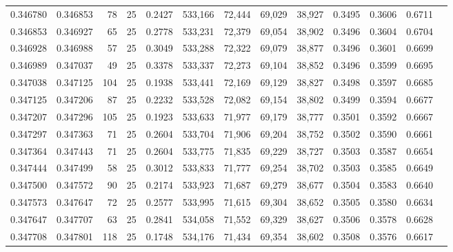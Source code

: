 \begin{tabular}{rrrrrrrrrrrrr}
0.346780 & 0.346853 &    78 &  25 &                                     0.2427 & 533,166 &  72,444 &  69,029 &  38,927 & 0.3495 & 0.3606 & 0.6711 \\
0.346853 & 0.346927 &    65 &  25 &                                     0.2778 & 533,231 &  72,379 &  69,054 &  38,902 & 0.3496 & 0.3604 & 0.6704 \\
0.346928 & 0.346988 &    57 &  25 &                                     0.3049 & 533,288 &  72,322 &  69,079 &  38,877 & 0.3496 & 0.3601 & 0.6699 \\
0.346989 & 0.347037 &    49 &  25 &                                     0.3378 & 533,337 &  72,273 &  69,104 &  38,852 & 0.3496 & 0.3599 & 0.6695 \\
0.347038 & 0.347125 &   104 &  25 &                                     0.1938 & 533,441 &  72,169 &  69,129 &  38,827 & 0.3498 & 0.3597 & 0.6685 \\
0.347125 & 0.347206 &    87 &  25 &                                     0.2232 & 533,528 &  72,082 &  69,154 &  38,802 & 0.3499 & 0.3594 & 0.6677 \\
0.347207 & 0.347296 &   105 &  25 &                                     0.1923 & 533,633 &  71,977 &  69,179 &  38,777 & 0.3501 & 0.3592 & 0.6667 \\
0.347297 & 0.347363 &    71 &  25 &                                     0.2604 & 533,704 &  71,906 &  69,204 &  38,752 & 0.3502 & 0.3590 & 0.6661 \\
0.347364 & 0.347443 &    71 &  25 &                                     0.2604 & 533,775 &  71,835 &  69,229 &  38,727 & 0.3503 & 0.3587 & 0.6654 \\
0.347444 & 0.347499 &    58 &  25 &                                     0.3012 & 533,833 &  71,777 &  69,254 &  38,702 & 0.3503 & 0.3585 & 0.6649 \\
0.347500 & 0.347572 &    90 &  25 &                                     0.2174 & 533,923 &  71,687 &  69,279 &  38,677 & 0.3504 & 0.3583 & 0.6640 \\
0.347573 & 0.347647 &    72 &  25 &                                     0.2577 & 533,995 &  71,615 &  69,304 &  38,652 & 0.3505 & 0.3580 & 0.6634 \\
0.347647 & 0.347707 &    63 &  25 &                                     0.2841 & 534,058 &  71,552 &  69,329 &  38,627 & 0.3506 & 0.3578 & 0.6628 \\
0.347708 & 0.347801 &   118 &  25 &                                     0.1748 & 534,176 &  71,434 &  69,354 &  38,602 & 0.3508 & 0.3576 & 0.6617 \\

\end{tabular}
